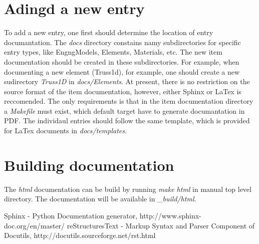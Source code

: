 \documentclass[11pt]{article}
\begin{document}
\section{Adingd a new entry}
To add a new entry, one first should determine the location of entry documantation. The {\em docs} directory constains namy subdirectories for specific entry types, like EngngModels, Elements, Materials, etc. The new item documentation should be created in these subdirectories. For example, when documenting a new element (Truss1d), for example, one should create a new sudirectory {\em Truss1D} in {\em docs/Elements}. At present, there is no restriction on the source format of the item documentation, however, either Sphinx or LaTex is reccomended. The only requirements is that in the item documentation directory a {\em Makefile} must exist, which default target have to generate documantation in PDF. The individaul entries should follow the same template, which is provided for LaTex documents in {\em docs/templates}. 

\section{Building documentation}
The {\em html} documentation can be build by running {\em make html} in manual top level directory. The documentation will be available in {\em \_build/html}.

\begin{thebibliography}{1}
Sphinx - Python Documentation generator, http://www.sphinx-doc.org/en/master/
reStructuresText - Markup Syntax and Parser Component of Docutils, http://docutils.sourceforge.net/rst.html
\end{thebibliography}
\end{document}

